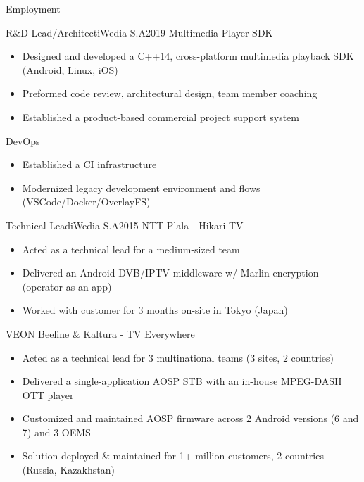 \documentclass[]{mcdowellcv}
\begin{document}
\begin{cvsection}{Employment}
		\begin{cvsubsection}{R\&D Lead/Architect}{iWedia S.A}{2019}
			Multimedia Player SDK
			\begin{itemize}
				\item Designed and developed a C++14, cross-platform multimedia playback SDK (Android, Linux, iOS)
				\item Preformed code review, architectural design, team member coaching
				\item Established a product-based commercial project support system \newline
			\end{itemize}
			DevOps
			\begin{itemize}
				\item Established a CI infrastructure
				\item Modernized legacy development environment and flows (VSCode/Docker/OverlayFS)
			\end{itemize}
		\end{cvsubsection}

		\begin{cvsubsection}{Technical Lead}{iWedia S.A}{2015}
			NTT Plala - Hikari TV
			\begin{itemize}
				\item Acted as a technical lead for a medium-sized team
				\item Delivered an Android DVB/IPTV middleware w/ Marlin encryption (operator-as-an-app)
				\item Worked with customer for 3 months on-site in Tokyo (Japan) \newline
			\end{itemize}
			VEON Beeline \& Kaltura - TV Everywhere
			\begin{itemize}
				\item Acted as a technical lead for 3 multinational teams (3 sites, 2 countries)
				\item Delivered a single-application AOSP STB with an in-house MPEG-DASH OTT player
				\item Customized and maintained AOSP firmware across 2 Android versions (6 and 7) and 3 OEMS
				\item Solution deployed \& maintained for 1+ million customers, 2 countries (Russia, Kazakhstan)
			\end{itemize}
		\end{cvsubsection}


\end{cvsection}
\end{document}
